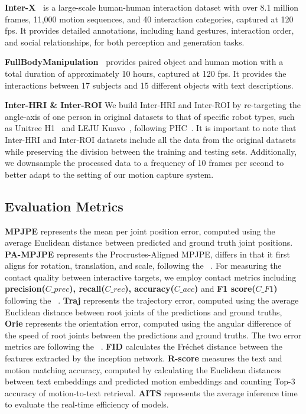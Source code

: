 \noindent \textbf{Inter-X~\cite{xu2024inter}} is a large-scale human-human interaction dataset with over 8.1 million frames, 11,000 motion sequences, and 40 interaction categories, captured at 120 fps. It provides detailed annotations, including hand gestures, interaction order, and social relationships, for both perception and generation tasks.

\noindent \textbf{FullBodyManipulation~\cite{li2023object}}
provides paired object and human motion with a total duration of approximately
10 hours, captured at 120 fps. It provides the interactions between 17 subjects and 15 different objects with text descriptions.

\noindent\textbf{Inter-HRI \& Inter-ROI} 
We build Inter-HRI and Inter-ROI by re-targeting the angle-axis of one person in original datasets to that of specific robot types, such as Unitree H1~\cite{unitreeh1robot} and LEJU Kuavo~\cite{lejukuavorobot}, following PHC~\cite{luo2023perpetual}. It is important to note that Inter-HRI and Inter-ROI datasets include all the data from the original datasets while preserving the division between the training and testing sets.
Additionally, we downsample the processed data to a frequency of 10 frames per second to better adapt to the setting of our motion capture system.


\subsection{Evaluation Metrics}

\textbf{MPJPE} represents the mean per joint position error, computed using the average Euclidean distance between predicted and ground truth joint positions. \textbf{PA-MPJPE} represents the Procrustes-Aligned MPJPE,  differs in that it first aligns for rotation, translation, and scale, following the ~\cite{deitke2020robothor}. For measuring the contact quality between interactive targets, we employ contact metrics including \textbf{precision($C\_prec$), recall($C\_rec$), accuracy($C\_acc$)} and \textbf{F1 score($C\_F1$)} following the ~\cite{li2023object}.
\textbf{Traj} represents the trajectory error, computed using the average Euclidean distance between root joints of the predictions and ground truths, 
\textbf{Orie} represents the orientation error, computed using the angular difference of the speed of root joints between the predictions and ground truths. The two error metrics are following the ~\cite{dai2024motionlcmrealtimecontrollablemotion}.
\textbf{FID } calculates the Fréchet distance between the features extracted by the inception network. \textbf{R-score} measures the text and motion matching accuracy, computed by calculating the Euclidean distances between text embeddings and predicted motion embeddings and counting Top-3 accuracy of motion-to-text retrieval. \textbf{AITS} represents the average inference time to evaluate the real-time efficiency of models.

